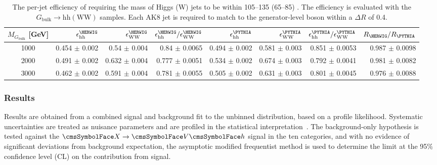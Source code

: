 \begin{table}
\vspace{1.2pt}
  \begin{center}
\caption{The per-jet efficiency of requiring the mass of Higgs (W) jets to 
be within 105--135 (65--85) \GeV. The efficiency is evaluated with the 
$G_\mathrm{bulk}\rightarrow \mathrm{hh} (\mathrm{WW})$ samples. Each AK8 jet is 
required to match to the generator-level boson within a $\Delta R$ of 0.4. }
  \begin{tabular}{c|rrrrrrr}
\hline\hline
$M_{G_\mathrm{bulk}}$ [GeV] &  $\epsilon_{\mathrm{hh}}^{\HERWIG}$ &  $\epsilon_{\mathrm{WW}}^{\HERWIG}$ & $\epsilon_{\mathrm{hh}}^{\HERWIG}/\epsilon_{\mathrm{WW}}^{\HERWIG}$ 
                                         &  $\epsilon_{\mathrm{hh}}^{\PYTHIA}$ &  $\epsilon_{\mathrm{WW}}^{\PYTHIA}$ &  $\epsilon_{\mathrm{hh}}^{\PYTHIA}/\epsilon_{\mathrm{WW}}^{\PYTHIA}$ &  $R_{\HERWIG}/R_{\PYTHIA}$ \\
\hline
1000 &   0.454 $\pm$ 0.002 & 0.54 $\pm$ 0.004 & 0.84 $\pm$ 0.0065 & 0.494 $\pm$ 0.002 & 0.581 $\pm$ 0.003 & 0.851 $\pm$ 0.0053 & 0.987 $\pm$ 0.0098 \\  
2000 &   0.491 $\pm$ 0.002 & 0.632 $\pm$ 0.004 & 0.777 $\pm$ 0.0051 & 0.534 $\pm$ 0.002 & 0.674 $\pm$ 0.003 & 0.792 $\pm$ 0.0041 & 0.981 $\pm$ 0.0082 \\
3000 &   0.462 $\pm$ 0.002 & 0.591 $\pm$ 0.004 & 0.781 $\pm$ 0.0055 & 0.505 $\pm$ 0.002 & 0.631 $\pm$ 0.003 & 0.801 $\pm$ 0.0045 & 0.976 $\pm$ 0.0088 \\

\hline
\hline
\end{tabular}
\label{tab:NarrowWindow}
\end{center}
\end{table}





\subsubsection*{Results}


Results are obtained from a combined signal and background fit to the unbinned \mVH distribution, based on a profile likelihood. Systematic uncertainties are treated as nuisance parameters and are profiled in the statistical interpretation~\cite{CLS1,CLS2,CMS-NOTE-2011-005,Asymptotic}. The background-only hypothesis is tested against the $\X\to\VH$ signal in the ten categories, and
with no evidence of significant deviations from background expectation, the asymptotic modified frequentist method is used to determine the limit at the 95\% confidence level (CL) on the contribution from signal.


